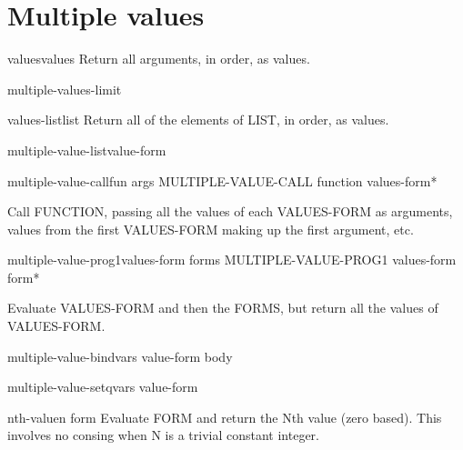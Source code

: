 \documentclass[10pt,english]{book}
\begin{document}
\section{Multiple values}
\label{sec:multiple-values}

\begin{accessor}{values}{\rest values}
  Return all arguments, in order, as values.
\end{accessor}

\begin{constant}{multiple-values-limit}{}
  
\end{constant}

\begin{function}{values-list}{list}
  Return all of the elements of LIST, in order, as values.
\end{function}

\begin{macro}{multiple-value-list}{value-form}
  
\end{macro}

\begin{specialop}{multiple-value-call}{fun \rest args}
  MULTIPLE-VALUE-CALL function values-form*

Call FUNCTION, passing all the values of each VALUES-FORM as arguments,
values from the first VALUES-FORM making up the first argument, etc.
\end{specialop}

\begin{specialop}{multiple-value-prog1}{values-form \rest forms}
  MULTIPLE-VALUE-PROG1 values-form form*

Evaluate VALUES-FORM and then the FORMS, but return all the values of
VALUES-FORM.
\end{specialop}

\begin{macro}{multiple-value-bind}{vars value-form \body body}
  
\end{macro}

\begin{macro}{multiple-value-setq}{vars value-form}
  
\end{macro}

\begin{macro}{nth-value}{n form}
  Evaluate FORM and return the Nth value (zero based). This involves no
  consing when N is a trivial constant integer.
\end{macro}
\end{document}
